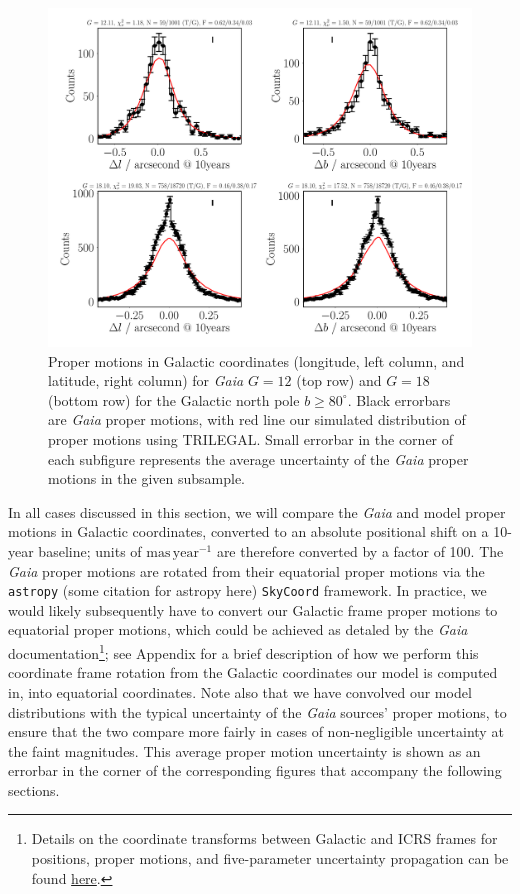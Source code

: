 \documentclass[fleqn,usenatbib]{mnras}
\begin{document}
\begin{figure}
    \centering
    \includegraphics[width=\columnwidth]{Plots/plots_pm_gaia_180_85.pdf}
    \caption{Proper motions in Galactic coordinates (longitude, left column, and latitude, right column) for \textit{Gaia} $G = 12$ (top row) and $G=18$ (bottom row) for the Galactic north pole $b \geq 80^\circ$. Black errorbars are \textit{Gaia} proper motions, with red line our simulated distribution of proper motions using TRILEGAL. Small errorbar in the corner of each subfigure represents the average uncertainty of the \textit{Gaia} proper motions in the given subsample.}
    \label{fig:polepmcomp}
\end{figure}

In all cases discussed in this section, we will compare the \textit{Gaia} and model proper motions in Galactic coordinates, converted to an absolute positional shift on a 10-year baseline; units of $\mathrm{mas}\,\mathrm{year}^{-1}$ are therefore converted by a factor of 100. The \textit{Gaia} proper motions are rotated from their equatorial proper motions via the \texttt{astropy} (some citation for astropy here) \texttt{SkyCoord} framework. In practice, we would likely subsequently have to convert our Galactic frame proper motions to equatorial proper motions, which could be achieved as detaled by the \textit{Gaia} documentation\footnote{Details on the coordinate transforms between Galactic and ICRS frames for positions, proper motions, and five-parameter uncertainty propagation can be found \href{https://gea.esac.esa.int/archive/documentation/GDR2/Data_processing/chap_cu3ast/sec_cu3ast_intro/ssec_cu3ast_intro_tansforms.html}{here}.}; see Appendix for a brief description of how we perform this coordinate frame rotation from the Galactic coordinates our model is computed in, into equatorial coordinates. Note also that we have convolved our model distributions with the typical uncertainty of the \textit{Gaia} sources' proper motions, to ensure that the two compare more fairly in cases of non-negligible uncertainty at the faint magnitudes. This average proper motion uncertainty is shown as an errorbar in the corner of the corresponding figures that accompany the following sections.
\end{document}
